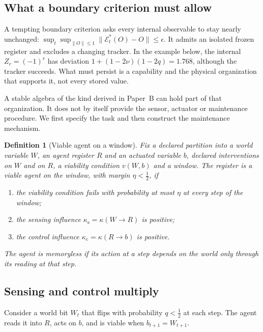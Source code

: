 \documentclass[11pt,a4paper]{article}
\newtheorem{definition}{Definition}[section]
\begin{document}
\subsection{What a boundary criterion must allow}

A tempting boundary criterion asks every internal observable to stay nearly
unchanged: \(\sup_t\sup_{\|O\|\le1}\|\mathcal E_t^*(O)-O\|\le\epsilon\).
It admits an isolated frozen register and excludes a changing tracker.
In the example below, the internal \(Z_r=(-1)^r\) has deviation
\(1+(1-2\nu)(1-2q)=1.768\), although the tracker succeeds.
What must persist is a capability and the physical organization that
supports it, not every stored value.

A stable algebra of the kind derived in Paper~B can hold part of that
organization. It does not by itself provide the sensor, actuator or
maintenance procedure. We first specify the task and then construct the
maintenance mechanism.

\begin{definition}[Viable agent on a window]
\label{def:agent}
Fix a declared partition into a world variable $W$, an agent register $R$ and an actuated variable $b$, declared interventions on $W$ and on $R$, a viability condition $v(W,b)$ and a window. The register is a viable agent on the window, with margin $\eta<\frac12$, if
\begin{enumerate}
\item the viability condition fails with probability at most $\eta$ at every step of the window;
\item the sensing influence $\kappa_{\mathrm s}=\kappa(W\to R)$ is positive;
\item the control influence $\kappa_{\mathrm c}=\kappa(R\to b)$ is positive.
\end{enumerate}
The agent is memoryless if its action at a step depends on the world only through its reading at that step.
\end{definition}

\subsection{Sensing and control multiply}

Consider a world bit $W_t$ that flips with probability $q<\frac12$ at each step. The agent reads it into $R$, acts on $b$, and is viable when $b_{t+1}=W_{t+1}$.
\end{document}
